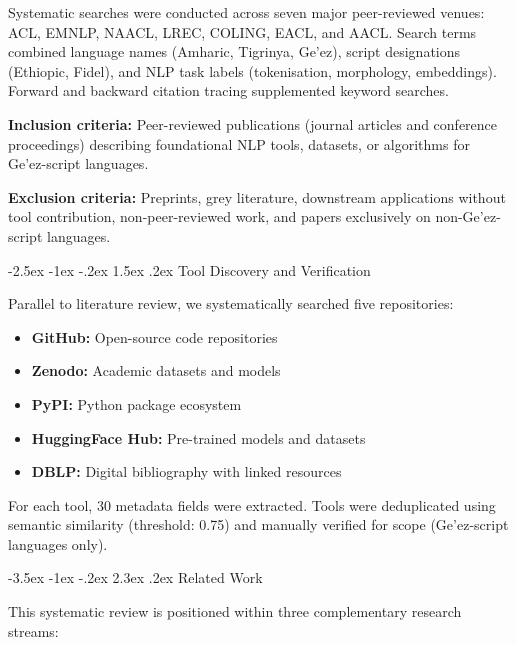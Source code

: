\documentclass[12pt,a4paper]{article}
\makeatletter
\theoremstyle{plain}
\theoremstyle{definition}
\renewcommand{\section}{\@startsection{section}{1}{\z@}%
  {-3.5ex \@plus -1ex \@minus -.2ex}%
  {2.3ex \@plus.2ex}%
  {\large\bfseries\color{NavyBlue}}}
\renewcommand{\subsection}{\@startsection{subsection}{2}{\z@}%
  {-2.5ex \@plus -1ex \@minus -.2ex}%
  {1.5ex \@plus .2ex}%
  {\normalsize\bfseries\color{DarkGray}}}
\makeatother
\begin{document}
Systematic searches were conducted across seven major peer-reviewed venues: ACL, EMNLP, NAACL, LREC, COLING, EACL, and AACL. Search terms combined language names (Amharic, Tigrinya, Ge'ez), script designations (Ethiopic, Fidel), and NLP task labels (tokenisation, morphology, embeddings). Forward and backward citation tracing supplemented keyword searches.

\textbf{Inclusion criteria:} Peer-reviewed publications (journal articles and conference proceedings) describing foundational NLP tools, datasets, or algorithms for Ge'ez-script languages.

\textbf{Exclusion criteria:} Preprints, grey literature, downstream applications without tool contribution, non-peer-reviewed work, and papers exclusively on non-Ge'ez-script languages.

\subsection{Tool Discovery and Verification}

Parallel to literature review, we systematically searched five repositories:

\begin{itemize}
    \item \textbf{GitHub:} Open-source code repositories
    \item \textbf{Zenodo:} Academic datasets and models
    \item \textbf{PyPI:} Python package ecosystem
    \item \textbf{HuggingFace Hub:} Pre-trained models and datasets
    \item \textbf{DBLP:} Digital bibliography with linked resources
\end{itemize}

For each tool, 30 metadata fields were extracted. Tools were deduplicated using semantic similarity (threshold: 0.75) and manually verified for scope (Ge'ez-script languages only).


\section{Related Work}

This systematic review is positioned within three complementary research streams:
\end{document}
